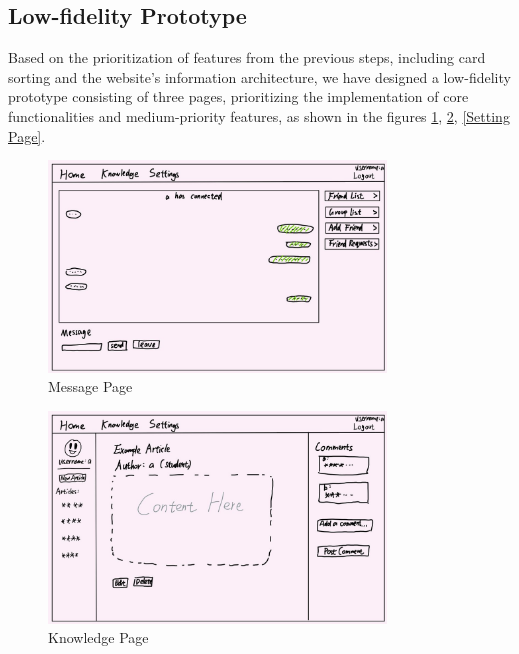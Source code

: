 \documentclass[12pt]{article}
\begin{document}
\subsection{Low-fidelity Prototype}
    Based on the prioritization of features from the previous steps, including card sorting and the website's information architecture, we have designed a low-fidelity prototype consisting of three pages, prioritizing the implementation of core functionalities and medium-priority features, as shown in the figures \ref{Message Page}, \ref{Knowledge Page}, \ref{Setting Page}.
            
    \begin{figure}[H]
        \centering
        \includegraphics[width=0.8\textwidth]{graphs/message_page.jpg}
        \caption{Message Page}
        \label{Message Page}
    \end{figure}

    \begin{figure}[H]
        \centering
        \includegraphics[width=0.8\textwidth]{graphs/knowledge_page.jpg}
        \caption{Knowledge Page}
        \label{Knowledge Page}
    \end{figure}
\end{document}
